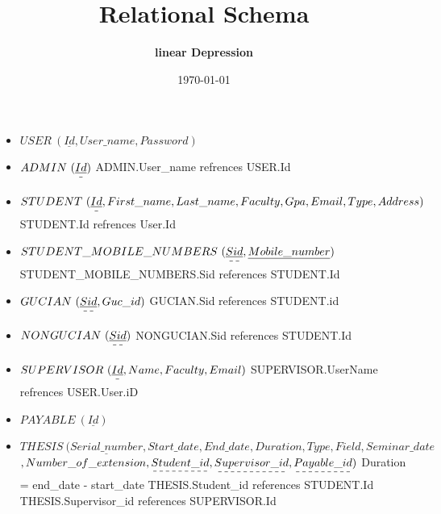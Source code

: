\documentclass[a4paper]{article}
\begin{document}
\author{\textbf{linear Depression}}
\title{\textbf{Relational Schema}}
\date {\today}
\maketitle

\noindent
\begin{itemize}
\item $USER\ (\underline{Id},User\_name,Password) $
 \newline
 \item $ADMIN\ (\dashuline{\underline{Id}}) $ 
 \newline ADMIN.User\_name refrences USER.Id
 \newline  
 \item$STUDENT \  (\dashuline{\underline{Id}},First\_name, Last\_name , Faculty, Gpa, Email,Type,Address )$
 \newline STUDENT.Id refrences User.Id
 \newline
 \item$STUDENT\_MOBILE\_NUMBERS\  (\dashuline{\underline{Sid}}, \underline{Mobile\_number})$
    \newline STUDENT\_MOBILE\_NUMBERS.Sid references STUDENT.Id
 \newline
 \item$ GUCIAN \ (\dashuline{\underline{Sid}}, Guc\_id)$
    \newline GUCIAN.Sid references STUDENT.id   
\newline
\item$ NONGUCIAN \ (\dashuline{\underline{Sid}})$
    \newline NONGUCIAN.Sid references STUDENT.Id
\newline
\item$SUPERVISOR \ (\dashuline{\underline{Id}}, Name , Faculty, Email)$
\newline SUPERVISOR.UserName refrences USER.User.iD
\item$PAYABLE\ (\underline{Id})$
\newline
\item$ THESIS \ (\underline{Serial\_number}, Start\_date, End\_date, Duration , Type,Field, Seminar\_date$\newline$ , Number\_of\_extension,\dashuline{Student\_id} ,\dashuline{Supervisor\_id} , \dashuline{Payable\_id})$
    \newline Duration = end\_date - start\_date
    \newline THESIS.Student\_id references STUDENT.Id
    \newline THESIS.Supervisor\_id references SUPERVISOR.Id

\end{itemize}
\end{document}
